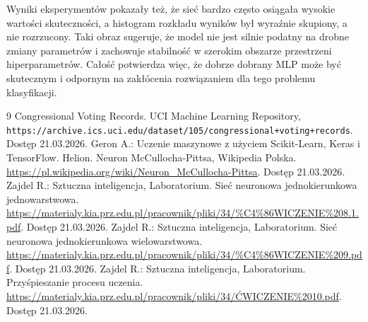 \documentclass[12pt,twoside]{article}
\begin{document}
Wyniki eksperymentów pokazały też, że sieć bardzo często osiągała wysokie wartości skuteczności, a histogram rozkładu wyników był wyraźnie skupiony, a nie rozrzucony. Taki obraz sugeruje, że model nie jest silnie podatny na drobne zmiany parametrów i zachowuje stabilność w szerokim obszarze przestrzeni hiperparametrów. Całość potwierdza więc, że dobrze dobrany MLP może być skutecznym i odpornym na zakłócenia rozwiązaniem dla tego problemu klasyfikacji.


\clearpage


\begin{thebibliography}{9}
 Congressional Voting Records. UCI Machine Learning Repository, 
\texttt{https://archive.ics.uci.edu/dataset/105/congressional+voting+records}. Dostęp 21.03.2026.
 Geron A.: Uczenie maszynowe z użyciem Scikit-Learn, Keras i TensorFlow. Helion.
 Neuron McCullocha-Pittsa, Wikipedia Polska. \url{https://pl.wikipedia.org/wiki/Neuron_McCullocha-Pittsa}. Dostęp 21.03.2026.
 Zajdel R.: Sztuczna inteligencja, Laboratorium. Sieć neuronowa jednokierunkowa jednowarstwowa. \url{https://materialy.kia.prz.edu.pl/pracownik/pliki/34/%C4%86WICZENIE%208.1.pdf}. Dostęp 21.03.2026.
 Zajdel R.: Sztuczna inteligencja, Laboratorium. Sieć neuronowa jednokierunkowa wielowarstwowa. \url{https://materialy.kia.prz.edu.pl/pracownik/pliki/34/%C4%86WICZENIE%209.pdf}. Dostęp 21.03.2026.
 Zajdel R.: Sztuczna inteligencja, Laboratorium. Przyśpieszanie procesu uczenia. \url{https://materialy.kia.prz.edu.pl/pracownik/pliki/34/ĆWICZENIE%2010.pdf}. Dostęp 21.03.2026.
\end{thebibliography}
\end{document}
